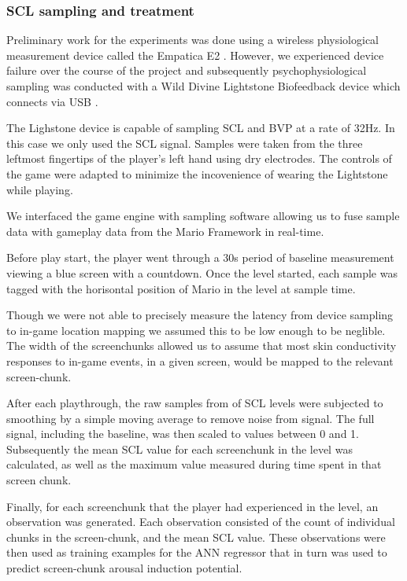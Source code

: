 \documentclass{llncs}
\begin{document}
\subsubsection{SCL sampling and treatment}
Preliminary work for the experiments was done using a wireless physiological measurement device called the Empatica E2 \cite{empatica}.
However, we experienced device failure over the course of the project and subsequently psychophysiological sampling was conducted with a Wild Divine Lightstone Biofeedback device which connects via USB \cite{wilddivine}.

The Lighstone device is capable of sampling SCL and BVP at a rate of 32Hz. In this case we only used the SCL signal.
Samples were taken from the three leftmost fingertips of the player's left hand using dry electrodes. The controls of the game were adapted to minimize the incovenience of wearing the Lightstone while playing.

We interfaced the game engine with sampling software allowing us to fuse sample data with gameplay data from the Mario Framework in real-time.

Before play start, the player went through a 30s period of baseline measurement viewing a blue screen with a countdown.
Once the level started, each sample was tagged with the horisontal position of Mario in the level at sample time. 

Though we were not able to precisely measure the latency from device sampling to in-game location mapping we assumed this to be low enough to be neglible.
The width of the screenchunks allowed us to assume that most skin conductivity responses to in-game events, in a given screen, would be mapped to the relevant screen-chunk.

After each playthrough, the raw samples from of SCL levels were subjected to smoothing by a simple moving average to remove noise from signal.
The full signal, including the baseline, was then scaled to values between 0 and 1. Subsequently the mean SCL value for each screenchunk in the level was calculated, as well as the maximum value measured during time spent in that screen chunk.

Finally, for each screenchunk that the player had experienced in the level, an observation was generated.
Each observation consisted of the count of individual chunks in the screen-chunk, and the mean SCL value.
These observations were then used as training examples for the ANN regressor that in turn was used to predict screen-chunk arousal induction potential.
\end{document}
